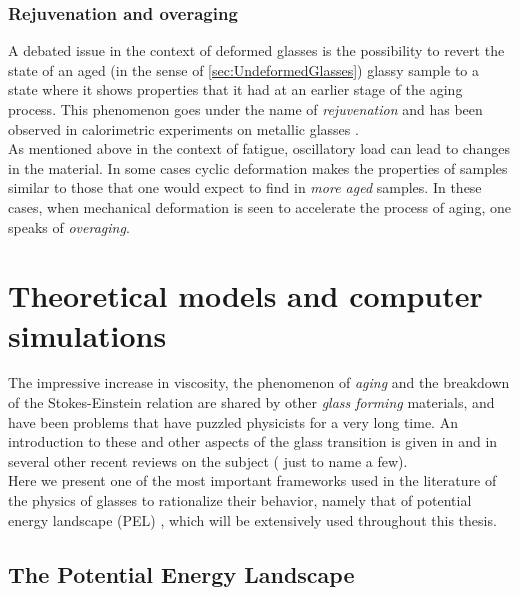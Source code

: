 \subsubsection{Rejuvenation and overaging}
A debated issue in the context of deformed glasses is the possibility to revert the state of an aged (in the sense of \autoref{sec:UndeformedGlasses}) glassy sample to a state where it shows properties that it had at an earlier stage of the aging process. This phenomenon goes under the name of \emph{rejuvenation} and has been observed in calorimetric experiments on metallic glasses \cite{concustell2009structural}. \\ 
As mentioned above in the context of fatigue, oscillatory load can lead to changes in the material. In some cases \cite{packard2008hardening} cyclic deformation makes the properties of samples similar to those that one would expect to find in \emph{more aged} samples. In these cases, when mechanical deformation is seen to accelerate the process of aging, one speaks of \emph{overaging}.

\section{Theoretical models and computer simulations}

The impressive increase in viscosity, the phenomenon of \emph{aging} and the breakdown of the Stokes-Einstein relation are shared by other \emph{glass forming} materials, and have been problems that have puzzled physicists for a very long time. An introduction to these and other aspects of the glass transition is given in \cite{cavagna2009supercooled} and in several other recent reviews on the subject (\cite{binder2011glassy, berthier2011theoretical, ediger2012perspective} just to name a few).\\
Here we present one of the most important frameworks used in the literature of the physics of glasses to rationalize their behavior, namely that of 
potential energy landscape (PEL) \cite{sciortino2005potential, heuer2008exploring}, which will be extensively used throughout this thesis. 

\subsection{The Potential Energy Landscape}

